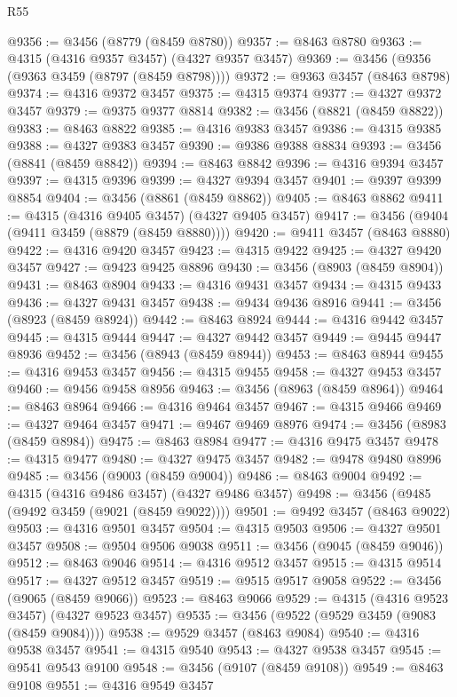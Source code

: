 \begin{lexlean}{R55}
\begin{coremodule}
@9356 := @3456 (@8779 (@8459 @8780))
@9357 := @8463 @8780
@9363 := @4315 (@4316 @9357 @3457) (@4327 @9357 @3457)
@9369 := @3456 (@9356 (@9363 @3459 (@8797 (@8459 @8798))))
@9372 := @9363 @3457 (@8463 @8798)
@9374 := @4316 @9372 @3457
@9375 := @4315 @9374
@9377 := @4327 @9372 @3457
@9379 := @9375 @9377 @8814
@9382 := @3456 (@8821 (@8459 @8822))
@9383 := @8463 @8822
@9385 := @4316 @9383 @3457
@9386 := @4315 @9385
@9388 := @4327 @9383 @3457
@9390 := @9386 @9388 @8834
@9393 := @3456 (@8841 (@8459 @8842))
@9394 := @8463 @8842
@9396 := @4316 @9394 @3457
@9397 := @4315 @9396
@9399 := @4327 @9394 @3457
@9401 := @9397 @9399 @8854
@9404 := @3456 (@8861 (@8459 @8862))
@9405 := @8463 @8862
@9411 := @4315 (@4316 @9405 @3457) (@4327 @9405 @3457)
@9417 := @3456 (@9404 (@9411 @3459 (@8879 (@8459 @8880))))
@9420 := @9411 @3457 (@8463 @8880)
@9422 := @4316 @9420 @3457
@9423 := @4315 @9422
@9425 := @4327 @9420 @3457
@9427 := @9423 @9425 @8896
@9430 := @3456 (@8903 (@8459 @8904))
@9431 := @8463 @8904
@9433 := @4316 @9431 @3457
@9434 := @4315 @9433
@9436 := @4327 @9431 @3457
@9438 := @9434 @9436 @8916
@9441 := @3456 (@8923 (@8459 @8924))
@9442 := @8463 @8924
@9444 := @4316 @9442 @3457
@9445 := @4315 @9444
@9447 := @4327 @9442 @3457
@9449 := @9445 @9447 @8936
@9452 := @3456 (@8943 (@8459 @8944))
@9453 := @8463 @8944
@9455 := @4316 @9453 @3457
@9456 := @4315 @9455
@9458 := @4327 @9453 @3457
@9460 := @9456 @9458 @8956
@9463 := @3456 (@8963 (@8459 @8964))
@9464 := @8463 @8964
@9466 := @4316 @9464 @3457
@9467 := @4315 @9466
@9469 := @4327 @9464 @3457
@9471 := @9467 @9469 @8976
@9474 := @3456 (@8983 (@8459 @8984))
@9475 := @8463 @8984
@9477 := @4316 @9475 @3457
@9478 := @4315 @9477
@9480 := @4327 @9475 @3457
@9482 := @9478 @9480 @8996
@9485 := @3456 (@9003 (@8459 @9004))
@9486 := @8463 @9004
@9492 := @4315 (@4316 @9486 @3457) (@4327 @9486 @3457)
@9498 := @3456 (@9485 (@9492 @3459 (@9021 (@8459 @9022))))
@9501 := @9492 @3457 (@8463 @9022)
@9503 := @4316 @9501 @3457
@9504 := @4315 @9503
@9506 := @4327 @9501 @3457
@9508 := @9504 @9506 @9038
@9511 := @3456 (@9045 (@8459 @9046))
@9512 := @8463 @9046
@9514 := @4316 @9512 @3457
@9515 := @4315 @9514
@9517 := @4327 @9512 @3457
@9519 := @9515 @9517 @9058
@9522 := @3456 (@9065 (@8459 @9066))
@9523 := @8463 @9066
@9529 := @4315 (@4316 @9523 @3457) (@4327 @9523 @3457)
@9535 := @3456 (@9522 (@9529 @3459 (@9083 (@8459 @9084))))
@9538 := @9529 @3457 (@8463 @9084)
@9540 := @4316 @9538 @3457
@9541 := @4315 @9540
@9543 := @4327 @9538 @3457
@9545 := @9541 @9543 @9100
@9548 := @3456 (@9107 (@8459 @9108))
@9549 := @8463 @9108
@9551 := @4316 @9549 @3457

\end{coremodule}
\end{lexlean}
